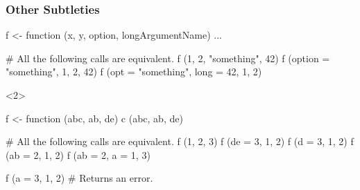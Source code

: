 \documentclass{beamer}
\begin{document}
\frame{\questiontoc}

\begin{frame}[fragile]
    \label{frame:other:subtleties}
    \frametitle{Other Subtleties}

\begin{Rcode}
f <- function (x, y, option, longArgumentName) ...

# All the following calls are equivalent.
f (1, 2, "something", 42)
f (option = "something", 1, 2, 42)
f (opt = "something", long = 42, 1, 2)
\end{Rcode}

\begin{overlayarea}{\textwidth}{5cm}
\begin{onlyenv}<2>
\begin{Rcode}
f <- function (abc, ab, de) c (abc, ab, de)

# All the following calls are equivalent.
f (1, 2, 3)
f (de = 3, 1, 2)
f (d = 3, 1, 2)
f (ab = 2, 1, 2)
f (ab = 2, a = 1, 3)

f (a = 3, 1, 2) # Returns an error.
\end{Rcode}
\end{onlyenv}
\end{overlayarea}

\end{frame}

\frame{\questiontoc}
\end{document}
